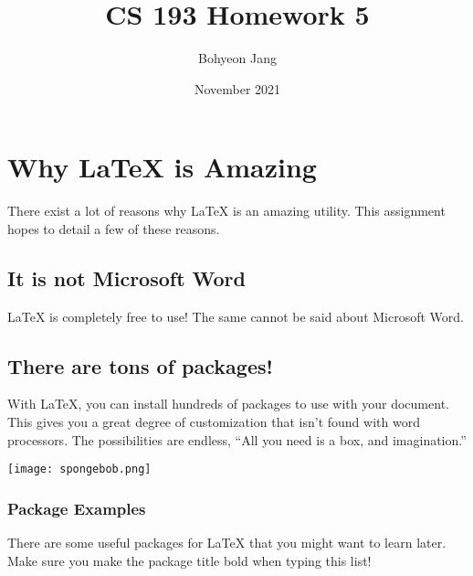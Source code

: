 \documentclass{article}
\title{CS 193 Homework 5}
\author{Bohyeon Jang}
\date{November 2021}
\begin{document}
\maketitle

\section{Why LaTeX is Amazing}
{There exist a lot of reasons why LaTeX is an amazing utility. This assignment hopes to detail a few of these reasons.}
\subsection{It is not Microsoft Word}
{LaTeX is completely free to use! The same cannot be said about Microsoft Word.}
\subsection{There are tons of packages!}
{With LaTeX, you can install hundreds of packages to use with your document. This gives you a great degree of customization that isn’t found with word processors. The possibilities are endless, “All you need is a box, and imagination.”}
\begin{center}
\texttt{[image: spongebob.png]}
\end{center}
\subsubsection{Package Examples}
{There are some useful packages for LaTeX that you might want to learn later. Make sure you make the package title bold when typing this list!}


\end{document}
